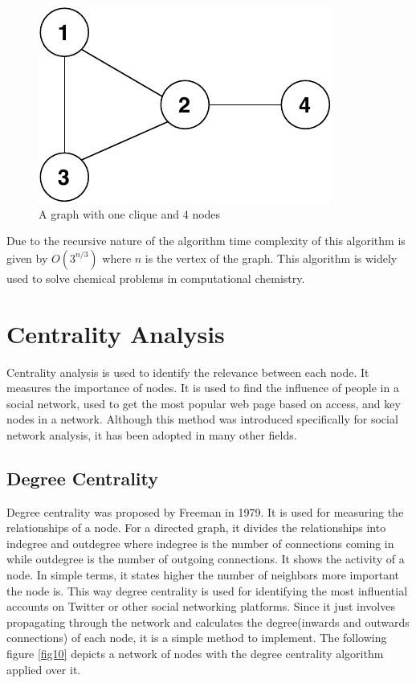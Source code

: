 \documentclass[journal,twoside,web]{ieeecolor}
\begin{document}
\begin{figure}[!h]
    \centerline{\includegraphics[scale=0.8]{figures/bron-kerbosch.pdf}}
    \caption{A graph with one clique and 4 nodes}
    \label{fig9}
\end{figure}

Due to the recursive nature of the algorithm time complexity of this algorithm is given by $O(3^{n/3})$ where $n$ is the vertex of the graph. This algorithm is widely used to solve chemical problems in computational chemistry.

\section{Centrality Analysis}
\label{sec:centrality}
Centrality analysis is used to identify the relevance between each node. It measures the importance of nodes. It is used to find the influence of people in a social network, used to get the most popular web page based on access, and key nodes in a network. Although this method was introduced specifically for social network analysis, it has been adopted in many other fields.

\subsection{Degree Centrality}
Degree centrality was proposed by Freeman in 1979\cite{25}. It is used for measuring the relationships of a node. For a directed graph, it divides the relationships into indegree and outdegree where indegree is the number of connections coming in while outdegree is the number of outgoing connections. It shows the activity of a node. In simple terms, it states higher the number of neighbors more important the node is. This way degree centrality is used for identifying the most influential accounts on Twitter or other social networking platforms. Since it just involves propagating through the network and calculates the degree(inwards and outwards connections) of each node, it is a simple method to implement. The following figure \ref{fig10} depicts a network of nodes with the degree centrality algorithm applied over it.
\end{document}
